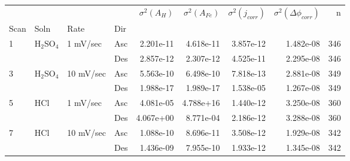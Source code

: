\begin{tabular}{llllrrrrr}
\toprule
  &     &           &     &  $\sigma^2(A_H)$ &  $\sigma^2(A_{Fe})$ &  $\sigma^2(j_{corr})$ &  $\sigma^2(\Delta \phi_{corr})$ &    n \\
Scan & Soln & Rate & Dir &                  &                     &                       &                                 &      \\
\midrule
1 & H$_2$SO$_4$ & 1 mV/sec & Asc &        2.201e-11 &           4.618e-11 &             3.857e-12 &                       1.482e-08 &  346 \\
  &     &           & Des &        2.857e-12 &           2.307e-12 &             4.525e-11 &                       2.295e-08 &  346 \\
3 & H$_2$SO$_4$ & 10 mV/sec & Asc &        5.563e-10 &           6.498e-10 &             7.818e-13 &                       2.881e-08 &  349 \\
  &     &           & Des &        1.988e-17 &           1.989e-17 &             1.538e-05 &                       1.267e-08 &  349 \\
5 & HCl & 1 mV/sec & Asc &        4.081e-05 &           4.788e+16 &             1.440e-12 &                       3.250e-08 &  360 \\
  &     &           & Des &        4.067e+00 &           8.771e-04 &             2.186e-12 &                       3.288e-08 &  360 \\
7 & HCl & 10 mV/sec & Asc &        1.088e-10 &           8.696e-11 &             3.508e-12 &                       1.929e-08 &  342 \\
  &     &           & Des &        1.436e-09 &           7.955e-10 &             1.933e-12 &                       1.345e-08 &  342 \\
\bottomrule
\end{tabular}
